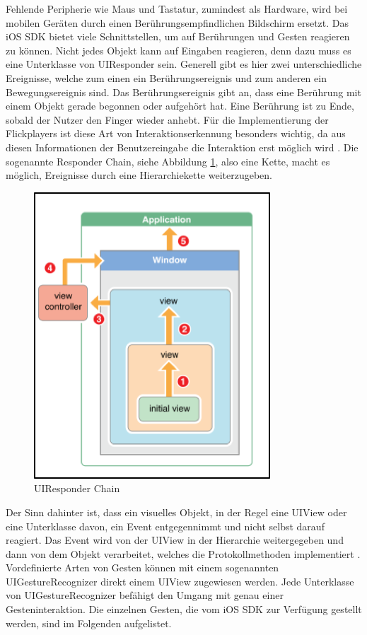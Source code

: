 \documentclass[11pt,a4paper]{report}
\begin{document}
Fehlende Peripherie wie Maus und Tastatur, zumindest als Hardware, wird bei mobilen Geräten durch einen Berührungsempfindlichen Bildschirm ersetzt. Das iOS SDK bietet viele Schnittstellen, um auf Berührungen und Gesten reagieren zu können. Nicht jedes Objekt kann auf Eingaben reagieren, denn dazu muss es eine Unterklasse von UIResponder sein. Generell gibt es hier zwei unterschiedliche Ereignisse, welche zum einen ein Berührungsereignis und zum anderen ein Bewegungsereignis sind. Das Berührungsereignis gibt an, dass eine Berührung mit einem Objekt gerade begonnen oder aufgehört hat. Eine Berührung ist zu Ende, sobald der Nutzer den Finger wieder anhebt. Für die Implementierung der Flickplayers ist diese Art von Interaktionserkennung besonders wichtig, da aus diesen Informationen der Benutzereingabe die Interaktion erst möglich wird \cite{UIResponderClass}. Die sogenannte Responder Chain, siehe Abbildung \ref{uiresponderchain}, also eine Kette, macht es möglich, Ereignisse durch eine Hierarchiekette weiterzugeben.
\begin{figure}[h]
\begin{center}
\includegraphics[scale=1.1]{./images/24.png}
\caption{UIResponder Chain \cite{UIResponderChain}}
\label{uiresponderchain}
\end{center}
\end{figure}
Der Sinn dahinter ist, dass ein visuelles Objekt, in der Regel eine UIView oder eine Unterklasse davon, ein Event entgegennimmt und nicht selbst darauf reagiert. Das Event wird von der UIView in der Hierarchie weitergegeben und dann von dem Objekt verarbeitet, welches die Protokollmethoden implementiert \cite{UIResponderChain}. Vordefinierte Arten von Gesten können mit einem sogenannten UIGestureRecognizer direkt einem UIView zugewiesen werden. Jede Unterklasse von UIGestureRecognizer befähigt den Umgang mit genau einer Gesteninteraktion. Die einzelnen Gesten, die vom iOS SDK zur Verfügung gestellt werden, sind im Folgenden aufgelistet.
\end{document}
